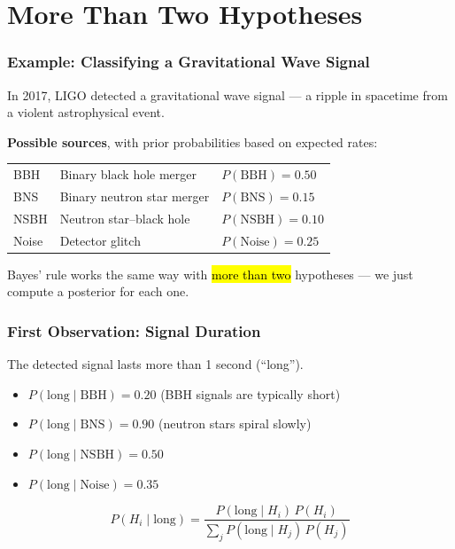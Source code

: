 \documentclass[slidestop,compress,mathserif]{beamer}
\begin{document}

\section{More Than Two Hypotheses}

\begin{frame}
    \frametitle{Example: Classifying a Gravitational Wave Signal}
    In 2017, LIGO detected a gravitational wave signal --- a ripple in spacetime from a violent astrophysical event.
    \pause

    \medskip
    \pause

    \medskip
    \textbf{Possible sources}, with prior probabilities based on expected rates:
    \renewcommand{\arraystretch}{1.2}
    \begin{center}
    \begin{tabular}{l l l}
    BBH & Binary black hole merger & $P(\text{BBH}) = 0.50$ \\
    BNS & Binary neutron star merger & $P(\text{BNS}) = 0.15$ \\
    NSBH & Neutron star--black hole & $P(\text{NSBH}) = 0.10$ \\
    Noise & Detector glitch & $P(\text{Noise}) = 0.25$
    \end{tabular}
    \end{center}
    \pause

    \medskip
    Bayes' rule works the same way with \hl{more than two} hypotheses --- we just compute a posterior for each one.
\end{frame}

\begin{frame}
    \frametitle{First Observation: Signal Duration}
    The detected signal lasts more than 1 second (``long'').
    \pause

    \medskip
    \begin{itemize}
        \item $P(\text{long} \mid \text{BBH}) = 0.20$ \quad (BBH signals are typically short)
        \item $P(\text{long} \mid \text{BNS}) = 0.90$ \quad (neutron stars spiral slowly)
        \item $P(\text{long} \mid \text{NSBH}) = 0.50$
        \item $P(\text{long} \mid \text{Noise}) = 0.35$
    \end{itemize}
    \pause

    \medskip
    \[
    P(H_i \mid \text{long}) = \frac{P(\text{long} \mid H_i)\, P(H_i)}{\sum_j P(\text{long} \mid H_j)\, P(H_j)}
    \]
\end{frame}
\end{document}
